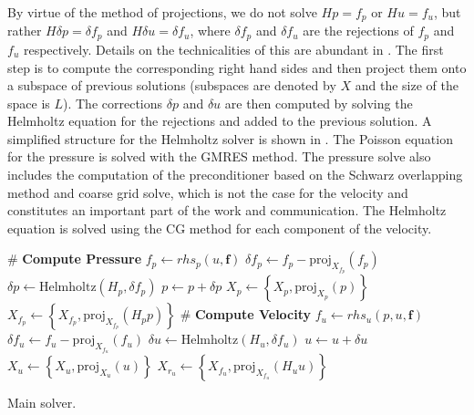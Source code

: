 \documentclass{sig-alternate}
\begin{document}
By virtue of the method of projections, we do not solve $Hp=f_p$ or $Hu=f_u$, but 
rather $H\delta p=\delta f_p$ and $H\delta u=\delta f_u$, where $\delta f_p$ and 
$\delta f_u$ are the rejections of $f_p$ and $f_u$ respectively. Details on the 
technicalities of this are abundant in \cite{Fischer1998}. The first step is to 
compute the corresponding right hand sides and then project them onto a subspace 
of previous solutions (subspaces are denoted by $X$ and the size of the space is $L$).
 The corrections $\delta p$ and $\delta u$ are then computed by solving the Helmholtz 
equation for the rejections and added to the previous solution. A simplified structure 
for the Helmholtz solver is shown in . The Poisson equation for
the pressure is solved with the GMRES method. The pressure solve also includes the
computation of the preconditioner based on the Schwarz overlapping method and 
coarse grid solve, which is not the case for the velocity and constitutes an 
important part of the work and communication. The Helmholtz equation is solved using the CG method for each component of the velocity.
\begin{algorithm}
\begin{algorithmic}
\State \# \textbf{Compute Pressure}
\State $f_p \leftarrow rhs_p(u, \mathbf{f})$ %
\State $\delta f_p \leftarrow f_p - \text{proj}_{X_{f_p}}(f_p)$ %
\State $\delta p \leftarrow \text{Helmholtz}(H_p,\delta f_p)$ %
\State $p \leftarrow p + \delta p$ %
\State $X_p \leftarrow \left\{ X_p, \text{proj}_{X_{p}}(p) \right\}$ %
\State $X_{f_p} \leftarrow \left\{ X_{f_p}, \text{proj}_{X_{f_p}}(H_p p) \right\}$ %
\State \# \textbf{Compute Velocity}
\State $f_{u} \leftarrow rhs_{u}(p, u, \mathbf{f})$ %
\State $\delta f_{u} \leftarrow f_{u} - \text{proj}_{X_{f_{u}}}(f_{u})$ %
\State $\delta {u} \leftarrow \text{Helmholtz}(H_{u},\delta f_{u})$ %
\State ${u} \leftarrow u + \delta u$ %
\State $X_{u} \leftarrow \left\{ X_{u}, \text{proj}_{X_{u}}(u) \right\}$ %
\State $X_{r_{u}} \leftarrow \left\{ X_{f_{u}}, \text{proj}_{X_{f_u}}(H_{u} u) \right\}$ %
\EndFor
\EndProcedure
\end{algorithmic}
\caption{Main solver.}
\label{alg:code_struct}
\end{algorithm}
\end{document}
